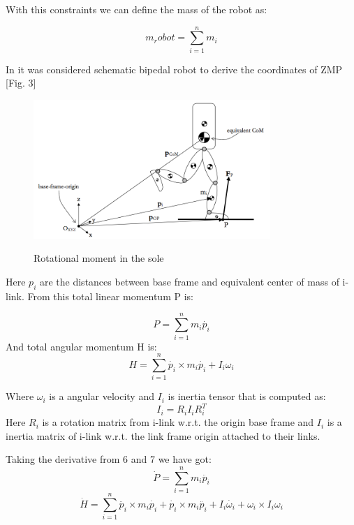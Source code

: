 \documentclass[11pt,a4paper]{article}
\begin{document}
With this constraints we can define the mass of the robot as:
	
	\begin{equation}
		m_robot = \sum^n_{i=1}{m_i}
	\end{equation}

In \cite{dekker2009zero} it was considered schematic bipedal robot to derive the coordinates of ZMP [Fig. 3]

	\begin{figure}[h!]
		\vspace{-0.2cm}
		\centering
		{\includegraphics[width=0.8\textwidth]{3}}
		\caption{Rotational moment in the sole}
		\label{fig:3}
		\vspace{-0.1cm}
	\end{figure}

Here $p_i$ are the distances between base frame and equivalent center of mass of i-link. From this total linear momentum P is:
	
	\begin{equation}
		P = \sum^n_{i=1}{m_i \dot{p_i}}
	\end{equation}
And total angular momentum H is:
	\begin{equation}
		H = \sum^n_{i=1}{\dot{p_i} \times m_i \dot{p_i} + I_i \omega_i}
	\end{equation}

Where $\omega_i$ is a angular velocity and $I_i$ is inertia tensor that is computed as:
	\begin{equation}
		I_i = R_i I_i R_i^T
	\end{equation}
Here $R_i$ is a rotation matrix from i-link w.r.t. the origin base frame and $I_i$ is a inertia matrix of i-link w.r.t. the link frame origin attached to their links.

Taking the derivative from 6 and 7 we have got:
	\begin{equation}
		\dot{P} = \sum^n_{i=1}{m_i \ddot{p_i}}
	\end{equation}
	\begin{equation}
		\dot{H} = \sum^n_{i=1}{\ddot{p_i} \times m_i \dot{p_i} + \dot{p_i} \times m_i \ddot{p_i} + I_i \dot{\omega_i}} + \omega_i \times I_i \omega_i
	\end{equation}
\end{document}
